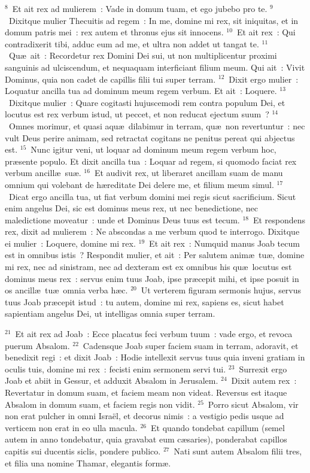 ${}^{8}$~Et ait rex ad mulierem~: Vade in domum tuam, et ego jubebo pro te.
${}^{9}$~Dixitque mulier Thecuitis ad regem~: In me, domine mi rex, sit iniquitas, et in domum patris mei~: rex autem et thronus ejus sit innocens.
${}^{10}$~Et ait rex~: Qui contradixerit tibi, adduc eum ad me, et ultra non addet ut tangat te.
${}^{11}$~Qu\ae\ ait~: Recordetur rex Domini Dei sui, ut non multiplicentur proximi sanguinis ad ulciscendum, et nequaquam interficiant filium meum. Qui ait~: Vivit Dominus, quia non cadet de capillis filii tui super terram.
${}^{12}$~Dixit ergo mulier~: Loquatur ancilla tua ad dominum meum regem verbum. Et ait~: Loquere.
${}^{13}$~Dixitque mulier~: Quare cogitasti hujuscemodi rem contra populum Dei, et locutus est rex verbum istud, ut peccet, et non reducat ejectum suum~?
${}^{14}$~Omnes morimur, et quasi aqu\ae\ dilabimur in terram, qu\ae\ non revertuntur~: nec vult Deus perire animam, sed retractat cogitans ne penitus pereat qui abjectus est.
${}^{15}$~Nunc igitur veni, ut loquar ad dominum meum regem verbum hoc, pr\ae sente populo. Et dixit ancilla tua~: Loquar ad regem, si quomodo faciat rex verbum ancill\ae\ su\ae .
${}^{16}$~Et audivit rex, ut liberaret ancillam suam de manu omnium qui volebant de h\ae reditate Dei delere me, et filium meum simul.
${}^{17}$~Dicat ergo ancilla tua, ut fiat verbum domini mei regis sicut sacrificium. Sicut enim angelus Dei, sic est dominus meus rex, ut nec benedictione, nec maledictione moveatur~: unde et Dominus Deus tuus est tecum.
${}^{18}$~Et respondens rex, dixit ad mulierem~: Ne abscondas a me verbum quod te interrogo. Dixitque ei mulier~: Loquere, domine mi rex.
${}^{19}$~Et ait rex~: Numquid manus Joab tecum est in omnibus istis~? Respondit mulier, et ait~: Per salutem anim\ae\ tu\ae , domine mi rex, nec ad sinistram, nec ad dexteram est ex omnibus his qu\ae\ locutus est dominus meus rex~: servus enim tuus Joab, ipse pr\ae cepit mihi, et ipse posuit in os ancill\ae\ tu\ae\ omnia verba h\ae c.
${}^{20}$~Ut verterem figuram sermonis hujus, servus tuus Joab pr\ae cepit istud~: tu autem, domine mi rex, sapiens es, sicut habet sapientiam angelus Dei, ut intelligas omnia super terram.


${}^{21}$~Et ait rex ad Joab~: Ecce placatus feci verbum tuum~: vade ergo, et revoca puerum Absalom.
${}^{22}$~Cadensque Joab super faciem suam in terram, adoravit, et benedixit regi~: et dixit Joab~: Hodie intellexit servus tuus quia inveni gratiam in oculis tuis, domine mi rex~: fecisti enim sermonem servi tui.
${}^{23}$~Surrexit ergo Joab et abiit in Gessur, et adduxit Absalom in Jerusalem.
${}^{24}$~Dixit autem rex~: Revertatur in domum suam, et faciem meam non videat. Reversus est itaque Absalom in domum suam, et faciem regis non vidit.
${}^{25}$~Porro sicut Absalom, vir non erat pulcher in omni Isra\"el, et decorus nimis~: a vestigio pedis usque ad verticem non erat in eo ulla macula.
${}^{26}$~Et quando tondebat capillum (semel autem in anno tondebatur, quia gravabat eum c\ae saries), ponderabat capillos capitis sui ducentis siclis, pondere publico.
${}^{27}$~Nati sunt autem Absalom filii tres, et filia una nomine Thamar, elegantis form\ae .


